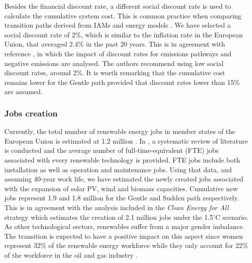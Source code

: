 \documentclass[3p]{elsarticle} %
\begin{document}
Besides the financial discount rate, a different social discount rate is used to calculate the cumulative system cost. This is common practice when comparing transition paths derived from IAMs and energy models \cite{in-depth_2018, Hermelink_2015}. We have selected a social discount rate of 2\%, which is similar to the inflation rate in the European Union, that averaged 2.4\% in the past 20 years. This is in agreement with reference \cite{Emmerling_2019}, in which the impact of discount rates for  emissions pathways and negative emissions are analysed. The authors recommend using low social discount rates, around 2\%. It is worth remarking that the cumulative cost remains lower for the Gentle path provided that discount rates lower than 15\% are assumed.


\subsubsection{Jobs creation}

Currently, the total number of renewable energy jobs in member states of the European Union is estimated at 1.2 million \cite{IRENA_jobs}. In \cite{Low_carbon_jobs}, a systematic review of literature is conducted and the average number of full-time-equivalent (FTE) jobs associated with every renewable technology is provided. FTE jobs include both installation as well as operation and maintenance jobs.  Using that data, and assuming 40-year work life, we have estimated the newly created jobs associated with the expansion of solar PV, wind and biomass capacities. Cumulative new jobs represent 1.9 and 1.8 million for the Gentle and Sudden path respectively. This is in agreement with the analysis included in the \textsl{Clean Energy for All} strategy \cite{in-depth_2018} which estimates the creation of 2.1 million jobs under the 1.5$^{\circ}$C scenario. As other technological sectors, renewables suffer from a major gender imbalance. The transition is expected to have a positive impact on this aspect since women represent 32\% of the renewable energy workforce while they only account for 22\% of the workforce in the oil and gas industry \cite{IRENA_gender}. 
\end{document}
